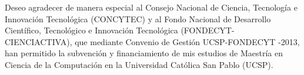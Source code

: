 \begin{agradecimientos}
Deseo agradecer de manera especial al Consejo Nacional de Ciencia, Tecnología e Innovación Tecnológica (CONCYTEC) y al Fondo Nacional de Desarrollo Científico, Tecnológico e Innovación Tecnológica (FONDECYT-CIENCIACTIVA), que mediante Convenio de Gestión UCSP-FONDECYT -2013, han permitido la subvención y financiamiento de mis estudios de Maestría en Ciencia de la Computación en la Universidad Católica San Pablo (UCSP).







\end{agradecimientos}